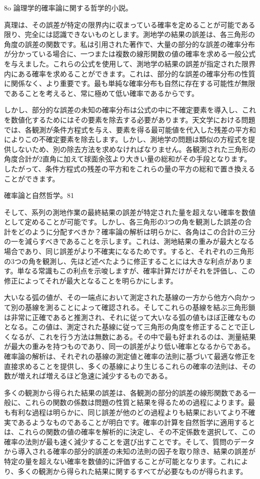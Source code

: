 \documentclass[a4paper,11pt,openany]{ltjsbook}
\begin{document}
8o        論理学的確率論に関する哲学的小説。

真理は、その誤差が特定の限界内に収まっている確率を定めることが可能である限り、完全には認識できないものとします。測地学の結果の誤差は、各三角形の角度の誤差の関数です。私は引用された著作で、大量の部分的な誤差の確率分布が分かっている場合に、一つまたは複数の線形関数の値の確率を求める一般公式を与えました。これらの公式を使用して、測地学の結果の誤差が指定された限界内にある確率を求めることができます。これは、部分的な誤差の確率分布の性質に関係なく、より重要です。最も単純な確率分布も自然に存在する可能性が無限であることを考えると、常に極めて低い確率であるからです。

しかし、部分的な誤差の未知の確率分布は公式の中に不確定要素を導入し、これを数値化するためにはその要素を除去する必要があります。天文学における問題では、各観測が条件方程式を与え、要素を得る最可能値を代入した残差の平方和によりこの不確定要素を除去します。しかし、測地学の問題は類似の方程式を提供しないため、別の除去方法を求めなければなりません。各観測された三角形の角度合計が2直角に加えて球面余弦より大きい量の総和がその手段となります。したがって、条件方程式の残差の平方和をこれらの量の平方の総和で置き換えることができます。

確率論と自然哲学。81

そして、系列の測地作業の最終結果の誤差が特定された量を超えない確率を数値として定めることが可能です。しかし、各三角形の3つの角を観測した誤差の合計をどのように分配すべきか？確率論の解析は明らかに、各角はこの合計の三分の一を減らすべきであることを示します。これは、測地結果の重みが最大となる場合であり、同じ誤差がより不確実になるためです。すると、それぞれの三角形の3つの角を観測し、先ほど述べたように修正することには大きな利点があります。単なる常識もこの利点を示唆しますが、確率計算だけがそれを評価し、この修正によってそれが最大となることを明らかにします。

大いなる弧の値が、その一端点において測定された基線の一方から他方へ向かって別の基線を測ることによって確認される。そしてこれらの基線を結ぶ三角形鎖は非常に正確であると推測され、それに従って大いなる弧の値もほぼ正確なものとなる。この値は、測定された基線に従って三角形の角度を修正することで正しくなるが、これを行う方法は無数にある。その中で最も好まれるのは、測量結果が最大の重みを持つものであり、同一の誤差がより低い確率となるからである。確率論の解析は、それぞれの基線の測定値と確率の法則に基づいて最適な修正を直接求めることを提供し、多くの基線により生じるこれらの確率の法則は、その数が増えれば増えるほど急速に減少するものである。

多くの観測から得られた結果の誤差は、各観測の部分的誤差の線形関数である一般に、これらの関数の係数は問題の性質と結果を得るための過程によります。最も有利な過程は明らかに、同じ誤差が他のどの過程よりも結果においてより不確実であるようなものであることが明白です。確率の計算を自然哲学に適用するとは、これらの関数の値の確率を解析的に決定し、その不定係数を選択して、この確率の法則が最も速く減少することを選び出すことです。そして、質問のデータから導入される確率の部分的誤差の未知の法則の因子を取り除き、結果の誤差が特定の量を超えない確率を数値的に評価することが可能となります。これにより、多くの観測から得られた結果に関するすべてが必要なものが得られます。
\end{document}
